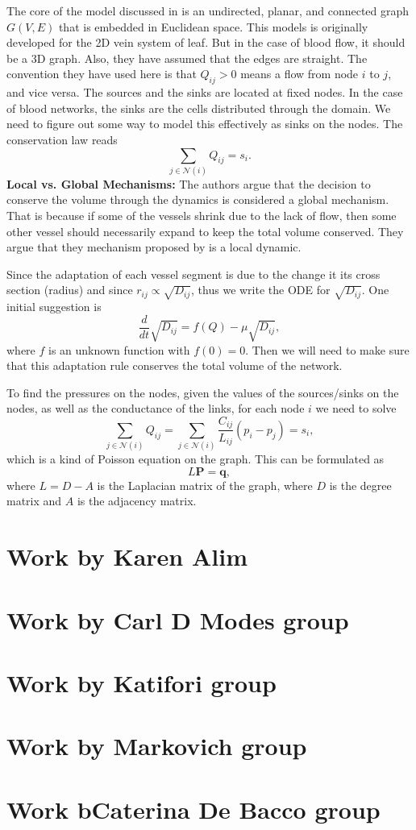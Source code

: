\documentclass[10pt,a4paper,twocolumn]{article}
\begin{document}
	The core of the model discussed in \cite{Almeida2023} is an undirected, planar, and connected graph $ G(V,E) $ that is embedded in Euclidean space. This models is originally developed for the 2D vein system of leaf. But in the case of blood flow, it should be a 3D graph. Also, they have assumed that the edges are straight. The convention they have used here is that $ Q_{ij}>0 $ means a flow from node $ i $ to $ j $, and vice versa. The sources and the sinks are located at fixed nodes. In the case of blood networks, the sinks are the cells distributed through the domain. We need to figure out some way to model this effectively as sinks on the nodes. The conservation law reads
	\[ \sum_{j\in\mathcal{N}(i)}Q_{ij} = s_i. \]
	\textbf{Local vs. Global Mechanisms:} The authors argue that the decision to conserve the volume through the dynamics is considered a global mechanism. That is because if some of the vessels shrink due to the lack of flow, then some other vessel should necessarily expand to keep the total volume conserved. They argue that they mechanism proposed by \cite{Tero2010} is a local dynamic.
	
	Since the adaptation of each vessel segment is due to the change it its cross section (radius) and since $ r_{ij} \propto \sqrt{D_{ij}} $, thus we write the ODE for $ \sqrt{D_{ij}} $. One initial suggestion is
	\[ \frac{d}{dt} \sqrt{D_{ij}} = f(Q) - \mu \sqrt{D_{ij}},\]
	where $ f $ is an unknown function with $ f(0) = 0 $. Then we will need to make sure that this adaptation rule conserves the total volume of the network.
	
	To find the pressures on the nodes, given the values of the sources/sinks on the nodes, as well as the conductance of the links, for each node $ i $ we need to solve
	\[ \sum_{j\in\mathcal{N}(i)}Q_{ij} = \sum_{j\in\mathcal{N}(i)}\frac{C_{ij}}{L_{ij}}(p_i - p_j) = s_i, \]
	which is a kind of Poisson equation on the graph. This can be formulated as
	\[ L \mathbf{P} = \mathbf{q}, \]
	where $ L = D - A $ is the Laplacian matrix of the graph, where $ D $ is the degree matrix and $ A $ is the adjacency matrix.
	
	
	\newpage
	\section{Work by Karen Alim}
	
	\section{Work by Carl D Modes group}
	
	\section{Work by Katifori group}
	 
	
	\section{Work by Markovich group}
	
	
	\section{Work bCaterina De Bacco group}
	
	\newpage
	
\end{document}
